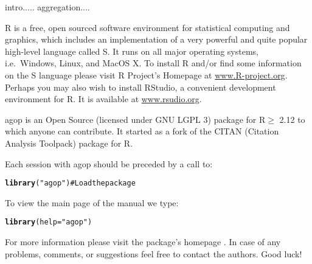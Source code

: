 \documentclass[11pt]{article}\usepackage{graphicx, color}
\makeatletter
\newcommand{\hlfunctioncall}[1]{\textcolor[rgb]{0.501960784313725,0,0.329411764705882}{\textbf{#1}}}%
\newcommand{\hlstring}[1]{\textcolor[rgb]{0.6,0.6,1}{#1}}%
\newenvironment{kframe}{%
 \def\at@end@of@kframe{}%
 \ifinner\ifhmode%
  \def\at@end@of@kframe{\end{minipage}}%
  \begin{minipage}{\columnwidth}%
 \fi\fi%
 \def\FrameCommand##1{\hskip\@totalleftmargin \hskip-\fboxsep
 \colorbox{shadecolor}{##1}\hskip-\fboxsep
     \hskip-\linewidth \hskip-\@totalleftmargin \hskip\columnwidth}%
 \MakeFramed {\advance\hsize-\width
   \@totalleftmargin\z@ \linewidth\hsize
   \@setminipage}}%
 {\par\unskip\endMakeFramed%
 \at@end@of@kframe}
\newenvironment{knitrout}{}{} %
\newcommand{\package}[1]{\textsf{#1}\xspace}
\newcommand{\program}[1]{\textsf{#1}\xspace}
\newcommand{\os}[1]{\textsf{#1}\xspace}
\newcommand{\lang}[1]{\textsf{#1}\xspace}
\newcommand{\R}{\lang{R}}
\theoremstyle{remark}
\theoremstyle{definition}
\makeatother
\begin{document}
intro.....
aggregation.... \cite{GrabischETAL2009:aggregationfunctions}



\R \cite{Rproject:home} is a free, open sourced software environment
for statistical computing and graphics, which
includes an implementation
of a very powerful and quite popular high-level language called \lang{S}.
It runs on all major operating systems, i.e.~\os{Windows},
\os{Linux}, and \os{MacOS X}.
To install \R and/or find some information on the \lang{S} language
please visit \R Project's Homepage at \href{http://www.R-project.org}{www.R-project.org}.
Perhaps you may also wish to install  \program{RStudio},
a convenient development environment for \R.
It is available at \href{http://rstudio.org/}{www.rsudio.org}.


\bigskip
\package{agop} is an Open Source (licensed under GNU LGPL 3)
package for \R$\ge$ 2.12 to which anyone can contribute.
It started as a fork of the \package{CITAN} (Citation
Analysis Toolpack) package for \R.

% 



\bigskip
Each session with \package{agop} should be preceded by
a call to:

\begin{knitrout}\small
{}\color{fgcolor}\begin{kframe}
\begin{alltt}
\hlfunctioncall{library}(\hlstring{"agop"}) # Load the package
\end{alltt}
\end{kframe}
\end{knitrout}


\bigskip
To view the main page of the manual we type:

\begin{knitrout}\small
{}\color{fgcolor}\begin{kframe}
\begin{alltt}
\hlfunctioncall{library}(help=\hlstring{"agop"})
\end{alltt}
\end{kframe}
\end{knitrout}


\noindent
For more information please visit the package's homepage \cite{agopHome}.
In case of any problems, comments, or suggestions feel free to contact the authors.
Good luck!
\end{document}
